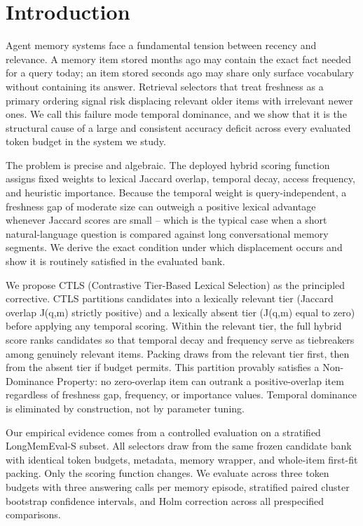 \section{Introduction}

\label{sec:introduction}

Agent memory systems face a fundamental tension between recency and relevance. A memory item stored months ago may contain the exact fact needed for a query today; an item stored seconds ago may share only surface vocabulary without containing its answer. Retrieval selectors that treat freshness as a primary ordering signal risk displacing relevant older items with irrelevant newer ones. We call this failure mode temporal dominance, and we show that it is the structural cause of a large and consistent accuracy deficit across every evaluated token budget in the system we study.

The problem is precise and algebraic. The deployed hybrid scoring function assigns fixed weights to lexical Jaccard overlap, temporal decay, access frequency, and heuristic importance. Because the temporal weight is query-independent, a freshness gap of moderate size can outweigh a positive lexical advantage whenever Jaccard scores are small -- which is the typical case when a short natural-language question is compared against long conversational memory segments. We derive the exact condition under which displacement occurs and show it is routinely satisfied in the evaluated bank.

We propose CTLS (Contrastive Tier-Based Lexical Selection) as the principled corrective. CTLS partitions candidates into a lexically relevant tier (Jaccard overlap J(q,m) strictly positive) and a lexically absent tier (J(q,m) equal to zero) before applying any temporal scoring. Within the relevant tier, the full hybrid score ranks candidates so that temporal decay and frequency serve as tiebreakers among genuinely relevant items. Packing draws from the relevant tier first, then from the absent tier if budget permits. This partition provably satisfies a Non-Dominance Property: no zero-overlap item can outrank a positive-overlap item regardless of freshness gap, frequency, or importance values. Temporal dominance is eliminated by construction, not by parameter tuning.

Our empirical evidence comes from a controlled evaluation on a stratified LongMemEval-S subset. All selectors draw from the same frozen candidate bank with identical token budgets, metadata, memory wrapper, and whole-item first-fit packing. Only the scoring function changes. We evaluate across three token budgets with three answering calls per memory episode, stratified paired cluster bootstrap confidence intervals, and Holm correction across all prespecified comparisons.

